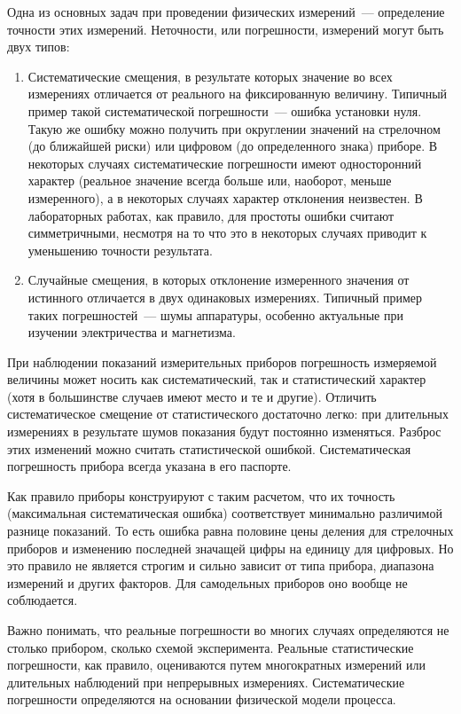 
Одна из основных задач при проведении физических измерений~--- определение точности этих измерений. Неточности, или погрешности, измерений могут быть двух типов:

\begin{enumerate}
	\item Систематические смещения, в результате которых значение во всех измерениях отличается от реального на фиксированную величину. Типичный пример такой систематической погрешности~--- ошибка установки нуля. Такую же ошибку можно получить при округлении значений на стрелочном (до ближайшей риски) или цифровом (до определенного знака) приборе. В некоторых случаях систематические погрешности имеют односторонний характер (реальное значение всегда больше или, наоборот, меньше измеренного), а в некоторых случаях характер отклонения неизвестен. В лабораторных работах, как правило, для простоты ошибки считают симметричными, несмотря на то что это в некоторых случаях приводит к уменьшению точности результата.

	\item Случайные смещения, в которых отклонение измеренного значения от истинного отличается в двух одинаковых измерениях. Типичный пример таких погрешностей~--- шумы аппаратуры, особенно актуальные при изучении электричества и магнетизма.
\end{enumerate}

При наблюдении показаний измерительных приборов погрешность измеряемой величины может носить как систематический, так и статистический характер (хотя в большинстве случаев имеют место и те и другие). Отличить систематическое смещение от статистического достаточно легко: при длительных измерениях в результате шумов показания будут постоянно изменяться. Разброс этих изменений можно считать статистической ошибкой. Систематическая погрешность прибора всегда указана в его паспорте.

Как правило приборы конструируют с таким расчетом, что их точность (максимальная систематическая ошибка) соответствует минимально различимой разнице показаний. То есть ошибка равна половине цены деления для стрелочных приборов и изменению последней значащей цифры на единицу для цифровых. Но это правило не является строгим и сильно зависит от типа прибора, диапазона измерений и других факторов. Для самодельных приборов оно вообще не соблюдается.

Важно понимать, что реальные погрешности во многих случаях определяются не столько прибором, сколько схемой эксперимента. Реальные статистические погрешности, как правило, оцениваются путем многократных измерений или длительных наблюдений при непрерывных измерениях. Систематические погрешности определяются на основании физической модели процесса.
